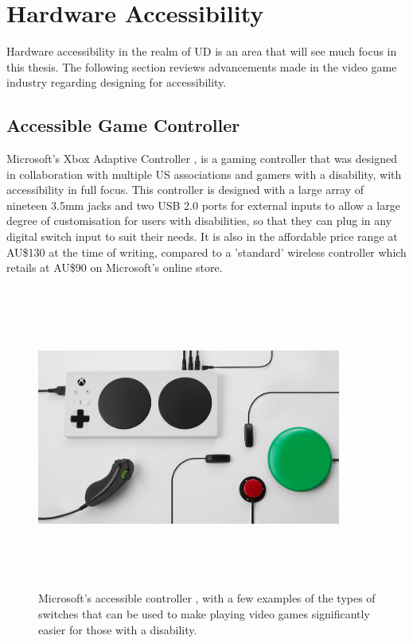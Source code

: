 \section{Hardware Accessibility}

Hardware accessibility in the realm of UD is an area that will see much focus in this thesis. %
The following section reviews advancements made in the video game industry regarding designing for accessibility.

\subsection{Accessible Game Controller}

Microsoft's Xbox Adaptive Controller \cite{adaptive}, is a gaming controller that was designed in collaboration with multiple US associations and gamers with a disability, with accessibility in full focus.
This controller is designed with a large array of nineteen 3.5mm jacks and two USB 2.0 ports for external inputs \cite{adaptive} to allow a large degree of customisation for users with disabilities, so that they can plug in any digital switch input to suit their needs.
It is also in the affordable price range at AU\$130 \cite{accessiblecontroller} at the time of writing, compared to a 'standard' wireless controller which retails at AU\$90 \cite{standardcontroller} on Microsoft's online store.

\begin{figure} [h]
    \centering
    \includegraphics[width=10cm,height=10cm,keepaspectratio]{Figures/accessible_controller.png}
    \caption{Microsoft's accessible controller \cite{adaptive}, with a few examples of the types of switches that can be used to make playing video games significantly easier for those with a disability.}
    \label{fig:Jellybean}
\end{figure}

